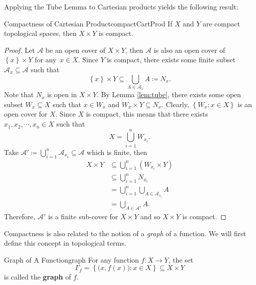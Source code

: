 \documentclass[math]{amznotes}
\theoremstyle{remark}
\begin{document}
Applying the Tube Lemma to Cartesian products yields the following result:
\begin{corbox}{Compactness of Cartesian Product}{compactCartProd}
    If $X$ and $Y$ are compact topological spaces, then $X \times Y$ is compact.
    \tcblower
    \begin{proof}
        Let $\mathcal{A}$ be an open cover of $X \times Y$, then $\mathcal{A}$ is also an open cover of $\left\{x\right\} \times Y$ for any~$x \in X$. Since $Y$ is compact, there exists some finite subset $\mathcal{A}_x \subseteq \mathcal{A}$ such that 
        \begin{equation*}
            \left\{x\right\} \times Y \subseteq \bigcup_{A \in \mathcal{A}_x}A \coloneqq N_x.
        \end{equation*}
        Note that $N_x$ is open in $X \times Y$. By Lemma \ref{lem:tube}, there exists some open subset $W_x \subseteq X$ such that $x \in W_x$ and $W_x \times Y \subseteq N_x$. Clearly, $\left\{W_x \colon x \in X\right\}$ is an open cover for $X$. Since $X$ is compact, this means that there exists $x_1, x_2, \cdots, x_n \in X$ such that 
        \begin{equation*}
            X = \bigcup_{i = 1}^nW_{x_i}.
        \end{equation*}
        Take $\mathcal{A}' \coloneqq \bigcup_{i = 1}^n\mathcal{A}_{x_i} \subseteq \mathcal{A}$ which is finite, then 
        \begin{align*}
            X \times Y & \subseteq \bigcup_{i = 1}^n\left(W_{x_i} \times Y\right) \\
            & \subseteq \bigcup_{i = 1}^nN_{x_i} \\
            & = \bigcup_{i = 1}^n\bigcup_{A \in \mathcal{A}_{x_i}}A \\
            & = \bigcup_{A \in \mathcal{A}'}A.
        \end{align*}
        Therefore, $\mathcal{A}'$ is a finite sub-cover for $X \times Y$ and so $X \times Y$ is compact.
    \end{proof}
\end{corbox}
Compactness is also related to the notion of a \textit{graph} of a function. We will first define this concept in topological terms.
\begin{dfnbox}{Graph of A Function}{graph}
    For any function $f \colon X \to Y$, the set 
    \begin{equation*}
        \Gamma_f = \left\{ \bigl(x, f(x)\bigr) \colon x \in X \right\} \subseteq X \times Y
    \end{equation*}
    is called the {\color{red} \textbf{graph}} of $f$.
\end{dfnbox}
\end{document}
